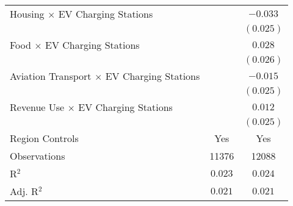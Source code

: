 \begin{center}
\begin{tiny}
\begin{longtable}{l@{} c@{} c@{}}
\quad Housing $\times$ EV Charging Stations              &                 & $-0.033$       \\
                                                         &                 & $(0.025)$      \\
\quad Food $\times$ EV Charging Stations                 &                 & $0.028$        \\
                                                         &                 & $(0.026)$      \\
\quad Aviation Transport $\times$ EV Charging Stations   &                 & $-0.015$       \\
                                                         &                 & $(0.025)$      \\
\quad Revenue Use $\times$ EV Charging Stations          &                 & $0.012$        \\
                                                         &                 & $(0.025)$      \\
\hline
Region Controls                                          & Yes             & Yes            \\
Observations                                             & 11376           & 12088          \\
R$^2$                                                    & $0.023$         & $0.024$        \\
Adj. R$^2$                                               & $0.021$         & $0.021$        \\
\end{longtable}
\end{tiny}
\end{center}
